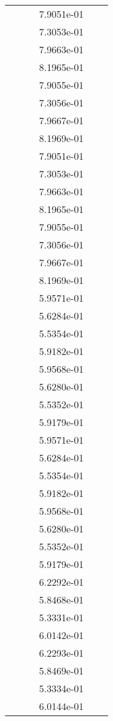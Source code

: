 \begin{xltabular}{\textwidth}{r|rS[table-format=1.3e+2]S[table-format=1.4e+2]S[table-format=1.4e+2]S[table-format=-1.5]}
&  &  & 7.9051e-01 & & \\
&  &  & 7.3053e-01 & & \\
&  &  & 7.9663e-01 & & \\
&  &  & 8.1965e-01 & & \\
&  &  & 7.9055e-01 & & \\
&  &  & 7.3056e-01 & & \\
&  &  & 7.9667e-01 & & \\
&  &  & 8.1969e-01 & & \\
&  &  & 7.9051e-01 & & \\
&  &  & 7.3053e-01 & & \\
&  &  & 7.9663e-01 & & \\
&  &  & 8.1965e-01 & & \\
&  &  & 7.9055e-01 & & \\
&  &  & 7.3056e-01 & & \\
&  &  & 7.9667e-01 & & \\
&  &  & 8.1969e-01 & & \\
&  &  & 5.9571e-01 & & \\
&  &  & 5.6284e-01 & & \\
&  &  & 5.5354e-01 & & \\
&  &  & 5.9182e-01 & & \\
&  &  & 5.9568e-01 & & \\
&  &  & 5.6280e-01 & & \\
&  &  & 5.5352e-01 & & \\
&  &  & 5.9179e-01 & & \\
&  &  & 5.9571e-01 & & \\
&  &  & 5.6284e-01 & & \\
&  &  & 5.5354e-01 & & \\
&  &  & 5.9182e-01 & & \\
&  &  & 5.9568e-01 & & \\
&  &  & 5.6280e-01 & & \\
&  &  & 5.5352e-01 & & \\
&  &  & 5.9179e-01 & & \\
&  &  & 6.2292e-01 & & \\
&  &  & 5.8468e-01 & & \\
&  &  & 5.3331e-01 & & \\
&  &  & 6.0142e-01 & & \\
&  &  & 6.2293e-01 & & \\
&  &  & 5.8469e-01 & & \\
&  &  & 5.3334e-01 & & \\
&  &  & 6.0144e-01 & & \\

\end{xltabular}
